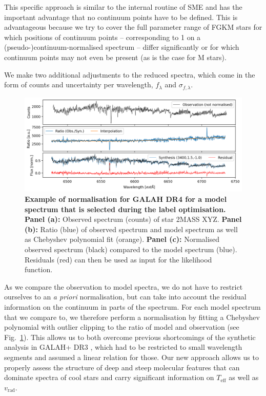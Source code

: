 \documentclass[
  journal=pasa,
  manuscript=research-paper, %
  year=2023,
  volume=37
]{cup-journal}
\newcommand{\Teff}{$T_\mathrm{eff}$\xspace}
\newcommand{\vrad}{$v_\mathrm{rad}$\xspace}
\begin{document}
This specific approach is similar to the internal routine of \textsc{SME} \citep{Piskunov2017} and has the important advantage that no continuum points have to be defined. This is advantageous because we try to cover the full parameter range of FGKM stars for which positions of continuum points -- corresponding to 1 on a (pseudo-)continuum-normalised spectrum -- differ significantly or for which continuum points may not even be present (as is the case for M stars).

We make two additional adjustments to the reduced spectra, which come in the form of counts and uncertainty per wavelength, $f_\lambda$ and $\sigma_{f,\lambda}$.

\begin{figure}[ht]
\centering
\includegraphics[width=\textwidth]{figures/Nuisance_example.png}
\caption{
\textbf{Example of normalisation for GALAH DR4 for a model spectrum that is selected during the label optimisation.}
\textbf{Panel (a):} Observed spectrum (counts) of star 2MASS XYZ.
\textbf{Panel (b):} Ratio (blue) of observed spectrum and model spectrum as well as Chebyshev polynomial fit (orange).
\textbf{Panel (c):} Normalised observed spectrum (black) compared to the model spectrum (blue). Residuals (red) can then be used as input for the likelihood function.
}
\label{fig:ratio_normalisation}
\end{figure}

As we compare the observation to model spectra, we do not have to restrict ourselves to an \textit{a priori} normalisation, but can take into account the residual information on the continuum in parts of the spectrum. For each model spectrum that we compare to, we therefore perform a normalisation by fitting a Chebyshev polynomial with outlier clipping to the ratio of model and observation (see Fig.~\ref{fig:ratio_normalisation}). This allows us to both overcome previous shortcomings of the synthetic analysis in GALAH+ DR3 \citep{Buder2021}, which had to be restricted to small wavelength segments and assumed a linear relation for those. Our new approach allows us to properly assess the structure of deep and steep molecular features that can dominate spectra of cool stars and carry significant information on \Teff as well as \vrad.
\end{document}
